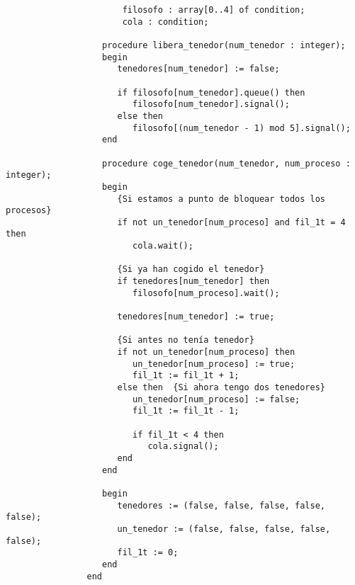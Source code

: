 \begin{ejercicio}
\begin{enumerate}
\begin{verbatim}
                       filosofo : array[0..4] of condition;
                       cola : condition;

                   procedure libera_tenedor(num_tenedor : integer);
                   begin
                      tenedores[num_tenedor] := false;

                      if filosofo[num_tenedor].queue() then
                         filosofo[num_tenedor].signal();
                      else then
                         filosofo[(num_tenedor - 1) mod 5].signal();
                   end

                   procedure coge_tenedor(num_tenedor, num_proceso : integer);
                   begin
                      {Si estamos a punto de bloquear todos los procesos}
                      if not un_tenedor[num_proceso] and fil_1t = 4 then
                         cola.wait();

                      {Si ya han cogido el tenedor}
                      if tenedores[num_tenedor] then
                         filosofo[num_proceso].wait();

                      tenedores[num_tenedor] := true;

                      {Si antes no tenía tenedor}
                      if not un_tenedor[num_proceso] then
                         un_tenedor[num_proceso] := true;
                         fil_1t := fil_1t + 1;
                      else then  {Si ahora tengo dos tenedores}
                         un_tenedor[num_proceso] := false;
                         fil_1t := fil_1t - 1;

                         if fil_1t < 4 then
                            cola.signal();
                      end
                   end

                   begin
                      tenedores := (false, false, false, false, false);
                      un_tenedor := (false, false, false, false, false);
                      fil_1t := 0;
                   end
                end
            \end{verbatim}
    \end{enumerate}
\end{ejercicio}







